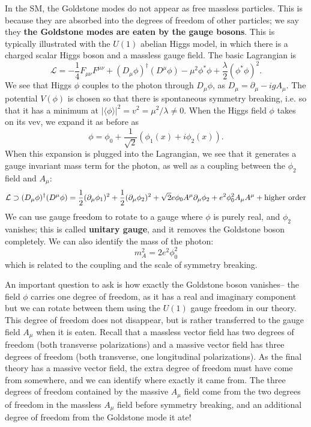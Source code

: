 \documentclass[11pt, oneside]{article}   	%
\theoremstyle{definition}
\numberwithin{equation}{subsection}		%
\begin{document}
In the SM, the Goldstone modes do not appear as free massless particles. This is because they are absorbed into the degrees 
of freedom of other particles; we say they \textbf{the Goldstone modes are eaten by the gauge bosons}. This is typically 
illustrated with the $U(1)$ abelian Higgs model, in which there is a charged scalar Higgs boson and a massless gauge 
field. The basic Lagrangian is
\begin{equation}
	\mathcal{L} = -\frac{1}{4} F_{\mu\nu} F^{\mu\nu} + (D_\mu\phi)^\dagger (D^\mu\phi) - \mu^2\phi^*\phi + \frac{\lambda}{2}
	(\phi^*\phi)^2.
\end{equation}
We see that Higgs $\phi$ couples to the photon through $D_\mu\phi$, as $D_\mu = \partial_\mu - ig A_\mu$. The potential 
$V(\phi)$ is chosen so that there is spontaneous symmetry breaking, i.e. so that it has a minimum at $|\langle\phi\rangle|^2 = 
v^2 = \mu^2 / \lambda\neq 0$. When the Higgs field $\phi$ takes on its vev, we expand it as before as 
\begin{equation}
	\phi = \phi_0 + \frac{1}{\sqrt 2}(\phi_1(x) + i\phi_2(x)).
\end{equation}
When this expansion is plugged into the Lagrangian, we see that it generates a gauge invariant mass term for the photon, 
as well as a coupling between the $\phi_2$ field and $A_\mu$:
\begin{equation}
	\mathcal{L}\supset (D_\mu\phi)^\dagger (D^\mu\phi) = \frac{1}{2}(\partial_\mu\phi_1)^2 + \frac{1}{2}(\partial_\mu\phi_2)^2 
	 + \sqrt{2} e \phi_0 A^\mu\partial_\mu\phi_2 + e^2\phi_0^2 A_\mu A^\mu + \textnormal{higher order}
\end{equation}
We can use gauge freedom to rotate to a gauge where $\phi$ is purely real, and $\phi_2$ vanishes; this is called \textbf{unitary 
gauge}, and it removes the Goldstone boson completely. We can also identify the mass of the photon:
\begin{equation}
	m_A^2 = 2e^2\phi_0^2
\end{equation}
which is related to the coupling and the scale of symmetry breaking. 

An important question to ask is how exactly the Goldstone boson vanishes-- the field $\phi$ carries one degree of freedom, 
as it has a real and imaginary component but we can rotate between them using the $U(1)$ gauge freedom in our theory. 
This degree of freedom does not disappear, but is rather transferred to the gauge field $A_\mu$ when it is eaten. Recall that 
a massless vector field has two degrees of freedom (both transverse polarizations) and a massive vector field has three 
degrees of freedom (both transverse, one longitudinal polarizations). As the final theory has a massive vector field, the 
extra degree of freedom must have come from somewhere, and we can identify where exactly it came from. The three 
degrees of freedom contained by the massive $A_\mu$ field come from the two degrees of freedom in the massless 
$A_\mu$ field before symmetry breaking, and an additional degree of freedom from the Goldstone mode it ate!
\end{document}
